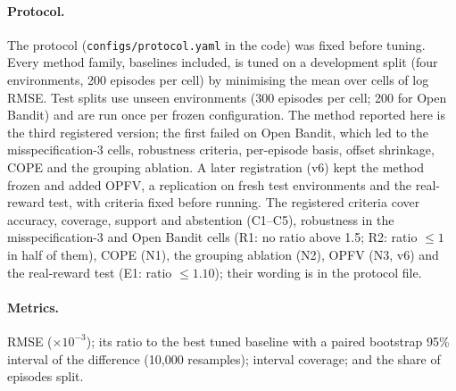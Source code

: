 \paragraph{Protocol.}
The protocol (\texttt{configs/protocol.yaml} in the code) was fixed before tuning. Every
method family, baselines included, is tuned on a development split (four environments,
200 episodes per cell) by minimising the mean over cells of log RMSE. Test splits use
unseen environments (300 episodes per cell; 200 for Open Bandit) and are run once per
frozen configuration. The method reported here is the third registered version; the first failed on Open Bandit, which
led to the misspecification-3 cells, robustness criteria, per-episode basis, offset shrinkage, COPE
and the grouping ablation. A later registration (v6) kept the method frozen and added OPFV, a
replication on fresh test environments and the real-reward test, with criteria fixed before running.
The registered criteria cover accuracy, coverage, support and abstention (C1--C5),
robustness in the misspecification-3 and Open Bandit cells (R1: no ratio above 1.5; R2: ratio
$\le1$ in half of them), COPE (N1), the grouping ablation (N2), OPFV (N3, v6) and the real-reward
test (E1: ratio $\le1.10$); their wording is in the protocol file.

\paragraph{Metrics.}
RMSE ($\times10^{-3}$); its ratio to the best tuned baseline with a paired bootstrap 95\%
interval of the difference (10{,}000 resamples); interval coverage; and the share of episodes split.
